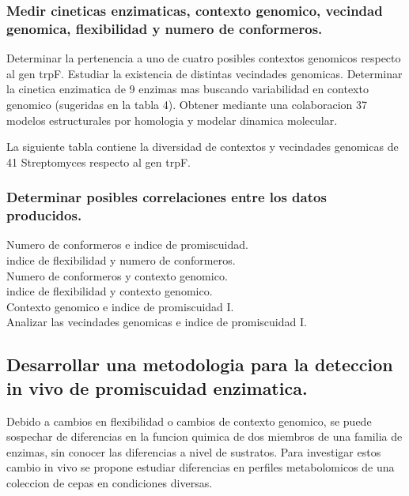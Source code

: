\documentclass[12pt,twoside]{reedthesis}
\begin{document}
  \subsubsection{Medir cineticas enzimaticas, contexto genomico, vecindad
  genomica, flexibilidad y numero de
  conformeros.}\label{medir-cineticas-enzimaticas-contexto-genomico-vecindad-genomica-flexibilidad-y-numero-de-conformeros.}
  
  Determinar la pertenencia a uno de cuatro posibles contextos genomicos
  respecto al gen trpF. Estudiar la existencia de distintas vecindades
  genomicas. Determinar la cinetica enzimatica de 9 enzimas mas buscando
  variabilidad en contexto genomico (sugeridas en la tabla 4). Obtener
  mediante una colaboracion 37 modelos estructurales por homologia y
  modelar dinamica molecular.
  
  La siguiente tabla contiene la diversidad de contextos y vecindades
  genomicas de 41 Streptomyces respecto al gen trpF.
  
  \subsubsection{Determinar posibles correlaciones entre los datos
  producidos.}\label{determinar-posibles-correlaciones-entre-los-datos-producidos.}
  
  Numero de conformeros e indice de promiscuidad.\\
  indice de flexibilidad y numero de conformeros.\\
  Numero de conformeros y contexto genomico.\\
  indice de flexibilidad y contexto genomico.\\
  Contexto genomico e indice de promiscuidad I.\\
  Analizar las vecindades genomicas e indice de promiscuidad I.
  
  \subsection{Desarrollar una metodologia para la deteccion in vivo de
  promiscuidad
  enzimatica.}\label{desarrollar-una-metodologia-para-la-deteccion-in-vivo-de-promiscuidad-enzimatica.}
  
  Debido a cambios en flexibilidad o cambios de contexto genomico, se
  puede sospechar de diferencias en la funcion quimica de dos miembros de
  una familia de enzimas, sin conocer las diferencias a nivel de
  sustratos. Para investigar estos cambio in vivo se propone estudiar
  diferencias en perfiles metabolomicos de una coleccion de cepas en
  condiciones diversas.
  
\end{document}

